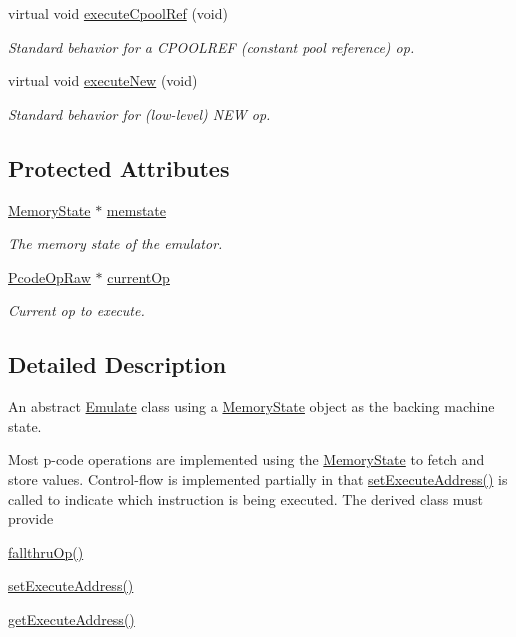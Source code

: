 \begin{DoxyCompactItemize}
virtual void \mbox{\hyperlink{class_emulate_memory_a057928f5f600a75a356d8e8e72e8c2cc}{execute\+Cpool\+Ref}} (void)
\begin{DoxyCompactList}\small\item\em Standard behavior for a C\+P\+O\+O\+L\+R\+EF (constant pool reference) op. \end{DoxyCompactList}\item 
virtual void \mbox{\hyperlink{class_emulate_memory_a1d547e9376fa63d32453b437a0537043}{execute\+New}} (void)
\begin{DoxyCompactList}\small\item\em Standard behavior for (low-\/level) N\+EW op. \end{DoxyCompactList}\end{DoxyCompactItemize}
\subsection*{Protected Attributes}
\begin{DoxyCompactItemize}
\item 
\mbox{\hyperlink{class_memory_state}{Memory\+State}} $\ast$ \mbox{\hyperlink{class_emulate_memory_a6ae15727f7c907169fc3df6f670afcfb}{memstate}}
\begin{DoxyCompactList}\small\item\em The memory state of the emulator. \end{DoxyCompactList}\item 
\mbox{\hyperlink{class_pcode_op_raw}{Pcode\+Op\+Raw}} $\ast$ \mbox{\hyperlink{class_emulate_memory_a12495eafd8592e36d55308db9a999d67}{current\+Op}}
\begin{DoxyCompactList}\small\item\em Current op to execute. \end{DoxyCompactList}\end{DoxyCompactItemize}


\subsection{Detailed Description}
An abstract \mbox{\hyperlink{class_emulate}{Emulate}} class using a \mbox{\hyperlink{class_memory_state}{Memory\+State}} object as the backing machine state. 

Most p-\/code operations are implemented using the \mbox{\hyperlink{class_memory_state}{Memory\+State}} to fetch and store values. Control-\/flow is implemented partially in that \mbox{\hyperlink{class_emulate_aff5f9779fdad54f853d4e799f5289410}{set\+Execute\+Address()}} is called to indicate which instruction is being executed. The derived class must provide
\begin{DoxyItemize}
\item \mbox{\hyperlink{class_emulate_ae9cd5b56525c54479e9c7add4a17687b}{fallthru\+Op()}}
\item \mbox{\hyperlink{class_emulate_aff5f9779fdad54f853d4e799f5289410}{set\+Execute\+Address()}}
\item \mbox{\hyperlink{class_emulate_aeca3c773876b391304afffe2a5eff9de}{get\+Execute\+Address()}}
\end{DoxyItemize}

